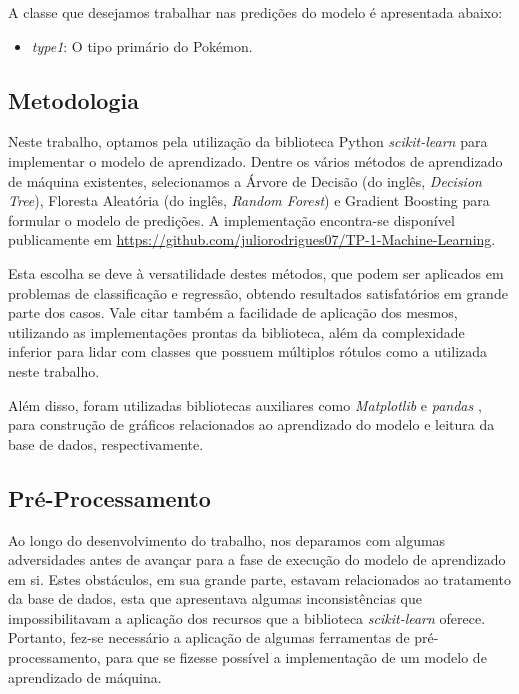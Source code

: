 \documentclass[12pt]{article}
\begin{document}
A classe que desejamos trabalhar nas predições do modelo é apresentada abaixo:

\begin{itemize}
    \item \emph{type1}: O tipo primário do Pokémon.
\end{itemize}

\subsection{Metodologia}

Neste trabalho, optamos pela utilização da biblioteca Python \emph{scikit-learn} para implementar o modelo de aprendizado. Dentre os vários métodos de aprendizado de máquina existentes, selecionamos a Árvore de Decisão (do inglês, \emph{Decision Tree}), Floresta Aleatória (do inglês, \emph{Random Forest}) e  Gradient Boosting para formular o modelo de predições. A implementação encontra-se disponível publicamente em \url{https://github.com/juliorodrigues07/TP-1-Machine-Learning}.

Esta escolha se deve à versatilidade destes métodos, que podem ser aplicados em problemas de classificação e regressão, obtendo resultados satisfatórios em grande parte dos casos. Vale citar também a facilidade de aplicação dos mesmos, utilizando as implementações prontas da biblioteca, além da complexidade inferior para lidar com classes que possuem múltiplos rótulos como a utilizada neste trabalho.

Além disso, foram utilizadas bibliotecas auxiliares como \emph{Matplotlib} \cite{Matplotlib} e \emph{pandas} \cite{pandas}, para construção de gráficos relacionados ao aprendizado do modelo e leitura da base de dados, respectivamente.

\subsection{Pré-Processamento}

Ao longo do desenvolvimento do trabalho, nos deparamos com algumas adversidades antes de avançar para a fase de execução do modelo de aprendizado em si. Estes obstáculos, em sua grande parte, estavam relacionados ao tratamento da base de dados, esta que apresentava algumas inconsistências que impossibilitavam a aplicação dos recursos que a biblioteca \emph{scikit-learn} oferece. Portanto, fez-se necessário a aplicação de algumas ferramentas de pré-processamento, para que se fizesse possível a implementação de um modelo de aprendizado de máquina.
\end{document}
